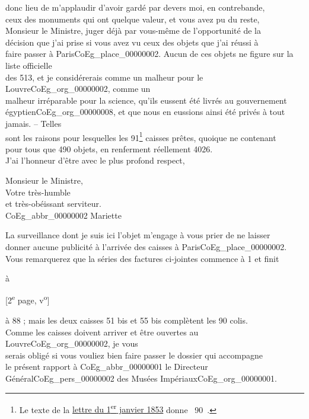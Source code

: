 \documentclass{book}
\begin{document}
donc lieu de m’applaudir d’avoir gardé par devers moi, en contrebande,\\
ceux des monuments qui ont quelque valeur, et vous avez pu du reste,\\
Monsieur le Ministre, juger déjà par vous-même de l’opportunité de la\\
décision que j’ai prise si vous avez vu ceux des objets que j’ai réussi à\\
faire passer à Paris\gls{CoEg_place_00000002}. Aucun de ces objets ne figure sur la liste officielle\\
des 513, et je considérerais comme un malheur pour le Louvre\gls{CoEg_org_00000002}, comme un\\
malheur irréparable pour la science, qu’ils eussent été livrés au gouvernement\\
égyptien\gls{CoEg_org_00000008}, et que nous en eussions ainsi été privés à tout jamais. – Telles\\
sont les raisons pour lesquelles les 91\footnote{Le texte de la \hyperref[CoEg_Mariette_1853-01-01]{lettre du 1\textsuperscript{er} janvier 1853} donne \og ~90~\fg.} caisses prêtes, quoique ne contenant\\
pour tous que 490 objets, en renferment réellement 4026.\\
\indent J’ai l’honneur d’être avec le plus profond respect,\\
\begin{center}Monsieur le Ministre,\\
\hspace{5cm} Votre très-humble\\
\hspace{5cm} et très-obéissant serviteur.\\
\hspace{5cm} \gls{CoEg_abbr_00000002} Mariette\end{center}
\indent La surveillance dont je suis ici l’objet m’engage à vous prier de ne laisser\\
donner aucune publicité à l’arrivée des caisses à Paris\gls{CoEg_place_00000002}.\\
\indent Vous remarquerez que la séries des factures ci-jointes commence à 1 et finit
\begin{flushright}à\end{flushright}
{\footnotesize\begin{center} {[2\textsuperscript{e} page, v\textsuperscript{o}]}\end{center}}
\noindent à 88 ; mais les deux caisses 51 bis et 55 bis complètent les 90 colis.\\
\indent Comme les caisses doivent arriver et être ouvertes au Louvre\gls{CoEg_org_00000002}, je vous\\
serais obligé si vous vouliez bien faire passer le dossier qui accompagne\\
le présent rapport à \gls{CoEg_abbr_00000001} le Directeur Général\gls{CoEg_pers_00000002} des Musées Impériaux\gls{CoEg_org_00000001}.
\end{document}
